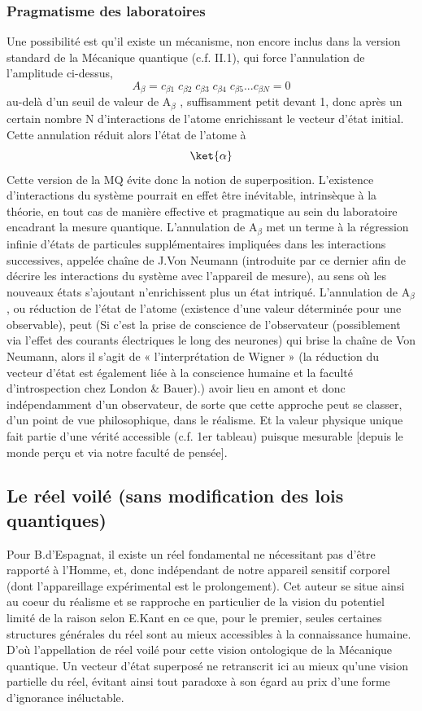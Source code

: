\subsubsection{Pragmatisme des laboratoires}
Une possibilité est qu’il existe un mécanisme, non encore inclus dans la version standard de
la Mécanique quantique (c.f. II.1), qui force l’annulation de l’amplitude ci-dessus,
\[
A_\beta=c_{\beta 1}\;c_{\beta 2}\;c_{\beta 3}\;c_{\beta 4}\;c_{\beta 5}...c_{\beta N} = 0
\]
au-delà d’un seuil de valeur de A$_\beta$ , suffisamment petit devant 1, donc après un certain
nombre N d’interactions de l’atome enrichissant le vecteur d’état initial. Cette annulation
réduit alors l’état de l’atome à
\[
\ket{\alpha}
\]
Cette version de la MQ évite donc la notion de superposition. L’existence d’interactions du
système pourrait en effet être inévitable, intrinsèque à la théorie, en tout cas de manière
effective et pragmatique au sein du laboratoire encadrant la mesure quantique. L’annulation
de A$_\beta$ met un terme à la régression infinie d’états de particules supplémentaires
 impliquées
dans les interactions successives, appelée chaîne de J.Von Neumann (introduite par ce
dernier afin de décrire les interactions du système avec l’appareil de mesure), au sens où les
nouveaux états s’ajoutant n’enrichissent plus un état intriqué. L’annulation de A$_\beta$ , ou
réduction de l’état de l’atome (existence d’une valeur déterminée pour une observable),
peut ({\footnotesize Si c’est la prise de conscience de l’observateur (possiblement via l’effet
 des courants électriques le long des neurones) qui brise la chaîne de Von Neumann, alors il
 s’agit de « l’interprétation de Wigner » (la réduction du
vecteur d’état est également liée à la conscience humaine et la faculté d’introspection chez
 London \& Bauer).}) avoir lieu en amont et donc indépendamment d’un observateur, de sorte que
  cette
approche peut se classer, d’un point de vue philosophique, dans le réalisme. Et la valeur
physique unique fait partie d’une vérité accessible (c.f. 1er tableau) puisque mesurable
[depuis le monde perçu et via notre faculté de pensée].
\subsection{Le réel voilé (sans modification des lois quantiques)}
Pour B.d’Espagnat, il existe un réel fondamental ne nécessitant pas d’être rapporté à
l’Homme, et, donc indépendant de notre appareil sensitif corporel (dont l’appareillage
expérimental est le prolongement). Cet auteur se situe ainsi au coeur du réalisme et se
rapproche en particulier de la vision du potentiel limité de la raison selon E.Kant en ce que,
pour le premier, seules certaines structures générales du réel sont au mieux accessibles à la
connaissance humaine. D’où l’appellation de réel voilé pour cette vision ontologique de la
Mécanique quantique. Un vecteur d’état superposé ne retranscrit ici au mieux qu’une vision
partielle du réel, évitant ainsi tout paradoxe à son égard au prix d’une forme d’ignorance
inéluctable.
